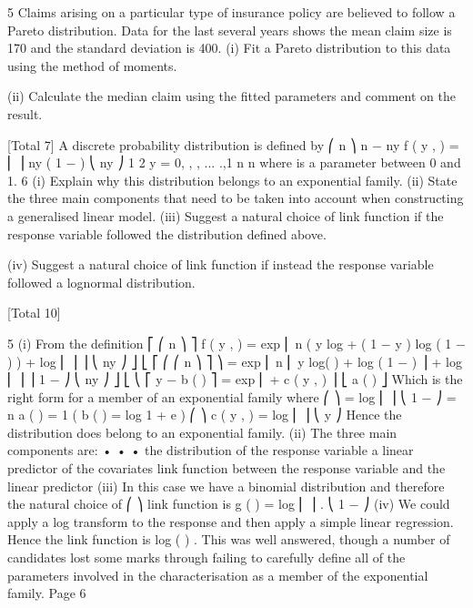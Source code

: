 5
Claims arising on a particular type of insurance policy are believed to follow a Pareto
distribution. Data for the last several years shows the mean claim size is 170 and the
standard deviation is 400.
(i) Fit a Pareto distribution to this data using the method of moments.

(ii) Calculate the median claim using the fitted parameters and comment on the
result.

[Total 7]
A discrete probability distribution is defined by
⎛ n ⎞
n − ny
f ( y , \mu  ) = ⎜ ⎟ \mu  ny ( 1 − \mu  )
⎝ ny ⎠
1 2
y = 0, , , ... .,1
n n
where \mu  is a parameter between 0 and 1.
6
(i) Explain why this distribution belongs to an exponential family. 
(ii) State the three main components that need to be taken into account when
constructing a generalised linear model. 
(iii) Suggest a natural choice of link function if the response variable followed the
distribution defined above.

(iv) Suggest a natural choice of link function if instead the response variable
followed a lognormal distribution.

[Total 10]




5
(i)
From the definition
⎡
⎛ n ⎞ ⎤
f ( y , \mu  ) = exp ⎢ n ( y log \mu  + ( 1 − y ) log ( 1 − \mu  ) ) + log ⎜ ⎟ ⎥
⎝ ny ⎠ ⎦
⎣
⎡ ⎛
⎛ n ⎞ ⎤
⎞
\mu 
= exp ⎢ n ⎜ y log(
) + log ( 1 − \mu  ) ⎟ + log ⎜ ⎟ ⎥
1 − \mu 
⎠
⎝ ny ⎠ ⎦
⎣ ⎝
⎡ y \theta  − b ( \theta  )
⎤
= exp ⎢
+ c ( y , \Phi ) ⎥
⎣ a ( \Phi )
⎦
Which is the right form for a member of an exponential family where
⎛ \mu  ⎞
\theta  = log ⎜
⎟
⎝ 1 − \mu  ⎠
\Phi= n
a ( \Phi ) =
1
\Phi
(
b ( \theta  ) = log 1 + e \theta 
)
⎛ \Phi ⎞
c ( y , \Phi ) = log ⎜ ⎟
⎝ \Phi y ⎠
Hence the distribution does belong to an exponential family.
(ii)
The three main components are:
•
•
•
the distribution of the response variable
a linear predictor of the covariates
link function between the response variable and the linear predictor
(iii) In this case we have a binomial distribution and therefore the natural choice of
⎛ \mu  ⎞
link function is g ( \mu  ) = log ⎜
⎟ .
⎝ 1 − \mu  ⎠
(iv) We could apply a log transform to the response and then apply a simple linear
regression. Hence the link function is log ( \mu  ) .
This was well answered, though a number of candidates lost some marks through failing to
carefully define all of the parameters involved in the characterisation as a member of the
exponential family.
Page 6%
